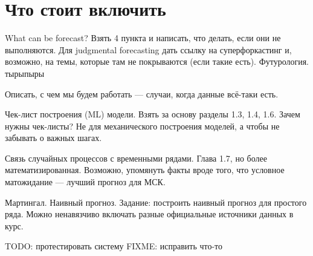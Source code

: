 \section{Что стоит включить}

What can be forecast? Взять 4 пункта и написать, что делать, если они
не выполняются. Для judgmental forecasting дать ссылку на
суперфоркастинг и, возможно, на темы, которые там не покрываются
(если такие есть). Футурология. тырыпыры

Описать, с чем мы будем работать — случаи, когда данные всё-таки есть.

Чек-лист построения (ML) модели. Взять за основу разделы 1.3, 1.4,
1.6. Зачем нужны чек-листы? Не для механического построения моделей,
а чтобы не забывать о важных шагах.

Связь случайных процессов с временными рядами. Глава 1.7, но более
математизированная. Возможно, упомянуть факты вроде того, что
условное матожидание — лучший прогноз для МСК.

Мартингал. Наивный прогноз.
Задание: построить наивный прогноз для простого ряда. Можно
ненавязчиво включать разные официальные источники данных в курс.

TODO: протестировать систему
FIXME: исправить что-то